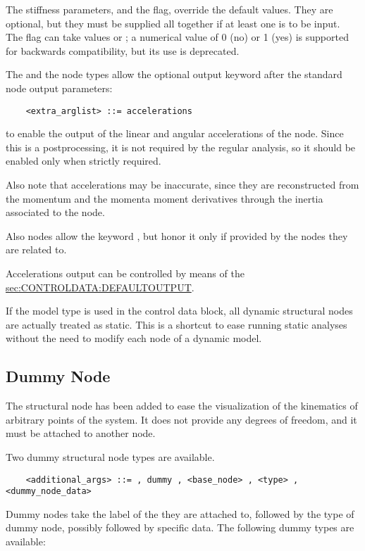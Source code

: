 The stiffness parameters, and the  flag, 
override the default values. 
They are optional, but they must be supplied all together if at least
one is to be input. \\
The  flag can take values  or ;
a numerical value of 0 (no) or 1 (yes) is supported for backwards
compatibility, but its use is deprecated.

The  and the  node types allow
the optional output keyword
 after the standard node output parameters:
\begin{verbatim}
    <extra_arglist> ::= accelerations
\end{verbatim}
to enable the output of the linear and angular accelerations of the node.
Since this is a postprocessing, it is not required by the regular analysis,
so it should be enabled only when strictly required.

Also note that accelerations may be inaccurate, since they are reconstructed
from the momentum and the momenta moment derivatives through the inertia
associated to the node.

Also  nodes allow the keyword ,
but honor it only if provided by the nodes they are related to.

Accelerations output can be controlled by means of the
\hyperref{\kw{default output} statement}{\kw{default output} statement (see Section~}{)}{sec:CONTROLDATA:DEFAULTOUTPUT}.

If the  model type is used in the control data block,
all dynamic structural nodes are actually treated as static.
This is a shortcut to ease running static analyses without the need
to modify each node of a dynamic model.

\subsection{Dummy Node}
\label{sec:NODE:STRUCTURAL:DUMMY}
The  structural node has been added to ease the visualization
of the kinematics of arbitrary points of the system. 
It does not provide any degrees of freedom, and it must be attached
to another node.

Two dummy structural node types are available.
\begin{verbatim}
    <additional_args> ::= , dummy , <base_node> , <type> , <dummy_node_data>
\end{verbatim}

Dummy nodes take the label of the  they are attached to, 
followed by the type of dummy node, possibly followed by specific data.
The following dummy types are available:

